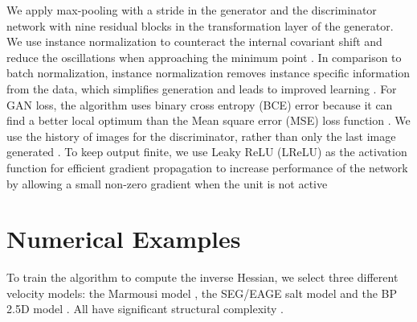 We apply max-pooling with a stride in the generator and the discriminator network with nine residual blocks in the transformation layer of the generator. We use instance normalization to counteract the internal covariant shift and reduce the oscillations when approaching the minimum point \cite[]{johnson2016perceptual}. In comparison to batch normalization, instance normalization removes instance specific information from the data, which simplifies generation and leads to improved learning \cite[]{DBLP:journals/corr/UlyanovVL16}. For GAN loss, the algorithm uses binary cross entropy (BCE) error because it can find a better local optimum than the Mean square error (MSE) loss function \cite[]{golik2013cross}. We use the history of images for the discriminator, rather than only the last image generated \cite[]{benaim2017one}. To keep output finite, we use Leaky ReLU (LReLU) as the activation function for efficient gradient propagation to increase performance of the network by allowing a small non-zero gradient when the unit is not active \cite[]{maas2013rectifier}

\section{Numerical Examples}
\hspace{\parindent} To train the algorithm to compute the inverse Hessian, we select three different  velocity models: the Marmousi model \cite[]{bourgeois1991marmousi}, the SEG/EAGE salt model  and the BP 2.5D model \cite[]{etgen1998strike}. All  have significant structural complexity . 

